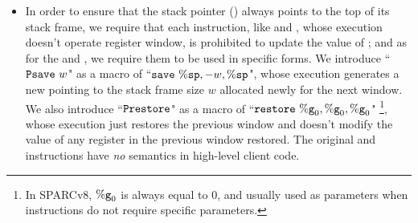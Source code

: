 \begin{itemize}
    \item
    In order to ensure that
    the stack pointer (\spreg{}) always
    points to the top of its stack frame, we require that
    each instruction, like \cadd{} and \ld{}, whose
    execution doesn't operate register window,
    is prohibited to update the value of \spreg{};
    and as for the \csave{} and \crestore{},
    we require them
    to be used in specific forms.
    We introduce ``$\Psave \ \word$" as a macro of
    ``$\csave{} \ \spreg, -\word, \spreg$", whose execution
    generates a new \spreg{} pointing to the stack frame
    size $w$ allocated newly for the next window.
    We also introduce ``$\texttt{Prestore}$"
    as a macro of ``$\texttt{restore}{} \ \%\texttt{g}_{0}, \%\texttt{g}_{0}, \%\texttt{g}_{0}$"
    \footnote{In SPARCv8, $\%\texttt{g}_{0}$ is always equal to 0,
    and usually used as parameters when instructions do not
    require specific parameters.},
    whose execution just restores the previous window
    and doesn't modify the value of any register
    in the previous window restored.
    The original \csave{} and \crestore{} instructions
    have \textit{no} semantics in high-level client code.


\end{itemize}
